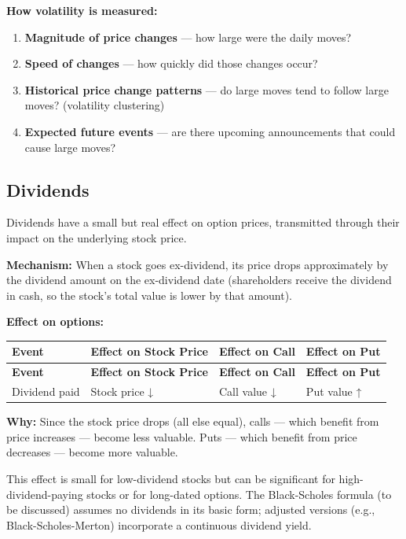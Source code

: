 \documentclass[12pt,openany]{book}
\theoremstyle{definition}
\theoremstyle{remark}
\begin{document}
\textbf{How volatility is measured:}

\begin{enumerate}
\item \textbf{Magnitude of price changes} --- how large were the daily moves?


\item \textbf{Speed of changes} --- how quickly did those changes occur?


\item \textbf{Historical price change patterns} --- do large moves tend to follow large moves? (volatility clustering)


\item \textbf{Expected future events} --- are there upcoming announcements that could cause large moves?


\end{enumerate}
\medskip
\subsection{Dividends}
Dividends have a small but real effect on option prices, transmitted through their impact on the underlying stock price.

\textbf{Mechanism:} When a stock goes ex-dividend, its price drops approximately by the dividend amount on the ex-dividend date (shareholders receive the dividend in cash, so the stock's total value is lower by that amount).

\textbf{Effect on options:}

\begingroup
\footnotesize
\begin{longtable}{@{}L{0.15\textwidth}L{0.25\textwidth}L{0.25\textwidth}L{0.25\textwidth}@{}}
\toprule
\textbf{Event} & \textbf{Effect on Stock Price} & \textbf{Effect on Call} & \textbf{Effect on Put} \\
\midrule
\endfirsthead
\toprule
\textbf{Event} & \textbf{Effect on Stock Price} & \textbf{Effect on Call} & \textbf{Effect on Put} \\
\midrule
\endhead
Dividend paid & Stock price ↓ & Call value ↓ & Put value ↑ \\
\bottomrule
\end{longtable}
\endgroup
\textbf{Why:} Since the stock price drops (all else equal), calls --- which benefit from price increases --- become less valuable. Puts --- which benefit from price decreases --- become more valuable.

This effect is small for low-dividend stocks but can be significant for high-dividend-paying stocks or for long-dated options. The Black-Scholes formula (to be discussed) assumes no dividends in its basic form; adjusted versions (e.g., Black-Scholes-Merton) incorporate a continuous dividend yield.
\end{document}
